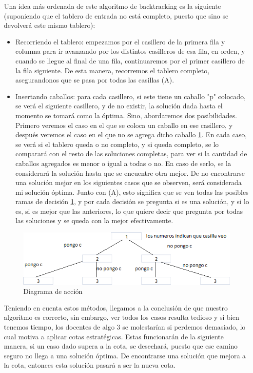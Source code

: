 Una idea más ordenada de este algoritmo de backtracking es la siguiente (suponiendo que el tablero de entrada no está completo, puesto que sino se devolverá este mismo tablero):
\begin{itemize}
\item Recorriendo el tablero: empezamos por el casillero de la primera fila y columna para ir avanzando por los distintos casilleros de esa fila, en orden, y cuando se llegue al final de una fila, continuaremos por el primer casillero de la fila siguiente. De esta manera, recorremos el tablero completo, asegurandonos que se pasa por todas las casillas (A).
\item Insertando caballos: para cada casillero, si este tiene un caballo "p" colocado, se verá el siguiente casillero, y de no existir, la solución dada hasta el momento se tomará como la óptima. Sino, abordaremos dos posibilidades. Primero veremos el caso en el que se coloca un caballo en ese casillero, y después veremos el caso en el que no se agrega dicho caballo \ref{fig:diag}. En cada caso, se verá si el tablero queda o no completo, y si queda completo, se lo comparará con el resto de las soluciones completas, para ver si la cantidad de caballos agregados es menor o igual a todas o no. En caso de serlo, se la considerará la solución hasta que se encuentre otra mejor. De no encontrarse una solución mejor en los siguientes casos que se observen, será considerada mi solución óptima. Junto con (A), esto significa que se ven todas las posibles ramas de decisión \ref{fig:diag}, y por cada decisión se pregunta si es una solución, y si lo es, si es mejor que las anteriores, lo que quiere decir que pregunta por todas las soluciones y se queda con la mejor efectivamente.
\end{itemize}
\begin{figure}[htb]
  \begin{center}
      \includegraphics[scale=0.6]{imagenes/tab9.png}
  \end{center}
  \caption{Diagrama de acción}\label{fig:diag}
\end{figure}

Teniendo en cuenta estos métodos, llegamos a la conclusión de que nuestro algoritmo es correcto, sin embargo, ver todos los casos resulta tedioso y si bien tenemos tiempo, los docentes de algo 3 se molestarían si perdemos demasiado, lo cual motiva a aplicar cotas estratégicas. Estas funcionarán de la siguiente manera, si un caso dado supera a la cota, se desechará, puesto que ese camino seguro no llega a una solución óptima. De encontrarse una solución que mejora a la cota, entonces esta solución pasará a ser la nueva cota.

